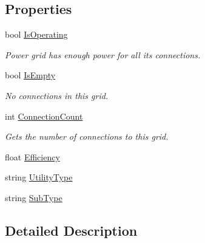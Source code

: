\subsection*{Properties}
\begin{DoxyCompactItemize}
\item 
bool \hyperlink{class_project_porcupine_1_1_power_network_1_1_grid_a278be982853de9eb9d48cf1c17c809ad}{Is\+Operating}
\begin{DoxyCompactList}\small\item\em Power grid has enough power for all its connections. \end{DoxyCompactList}\item 
bool \hyperlink{class_project_porcupine_1_1_power_network_1_1_grid_ae22c90c2c9607a8cdd87383369831dc2}{Is\+Empty}
\begin{DoxyCompactList}\small\item\em No connections in this grid. \end{DoxyCompactList}\item 
int \hyperlink{class_project_porcupine_1_1_power_network_1_1_grid_a87dd40416d4bc9632276dcadbbe9d32d}{Connection\+Count}
\begin{DoxyCompactList}\small\item\em Gets the number of connections to this grid. \end{DoxyCompactList}\item 
float \hyperlink{class_project_porcupine_1_1_power_network_1_1_grid_a26262c4410cf9fd06c0cb65172d320ce}{Efficiency}
\item 
string \hyperlink{class_project_porcupine_1_1_power_network_1_1_grid_ae15fa1698e2b9a4584e012f42a723833}{Utility\+Type}
\item 
string \hyperlink{class_project_porcupine_1_1_power_network_1_1_grid_ad3119ffe11797d4cbec859b501ed5437}{Sub\+Type}
\end{DoxyCompactItemize}


\subsection{Detailed Description}


